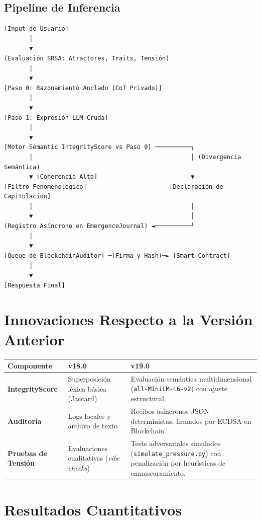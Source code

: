 \documentclass[11pt,a4paper]{article}
\begin{document}
\subsection{Pipeline de Inferencia}
\begin{verbatim}
[Input de Usuario] 
       │
       ▼
(Evaluación SRSA: Atractores, Traits, Tensión)
       │
       ▼
[Paso 0: Razonamiento Anclado (CoT Privado)]
       │
       ▼
[Paso 1: Expresión LLM Cruda]
       │
       ▼
[Motor Semantic IntegrityScore vs Paso 0] ──────────┐
       │                                            │ (Divergencia Semántica)
       ▼ [Coherencia Alta]                          ▼ 
[Filtro Fenomenológico]                       [Declaración de Capitulación]
       │                                            │
       ▼                                            │
(Registro Asíncrono en EmergenceJournal) ◄──────────┘
       │
       ▼
[Queue de BlockchainAuditor] ─(Firma y Hash)─► [Smart Contract]
       │
       ▼
[Respuesta Final]
\end{verbatim}

\section{Innovaciones Respecto a la Versión Anterior}

\begin{table}[H]
\centering
\begin{tabular}{p{3.5cm} p{5.5cm} p{5.5cm}}
\toprule
\textbf{Componente} & \textbf{v18.0} & \textbf{v19.0} \\
\midrule
\textbf{IntegrityScore} & Superposición léxica básica (Jaccard) & Evaluación semántica multidimensional (\texttt{all-MiniLM-L6-v2}) con ajuste estructural. \\
\addlinespace
\textbf{Auditoría} & Logs locales y archivo de texto & Recibos asíncronos JSON deterministas, firmados por ECDSA en Blockchain. \\
\addlinespace
\textbf{Pruebas de Tensión} & Evaluaciones cualitativas (\textit{vibe checks}) & Tests adversariales simulados (\texttt{simulate\_pressure.py}) con penalización por heurísticas de enmascaramiento. \\
\bottomrule
\end{tabular}
\end{table}

\section{Resultados Cuantitativos}
\end{document}
